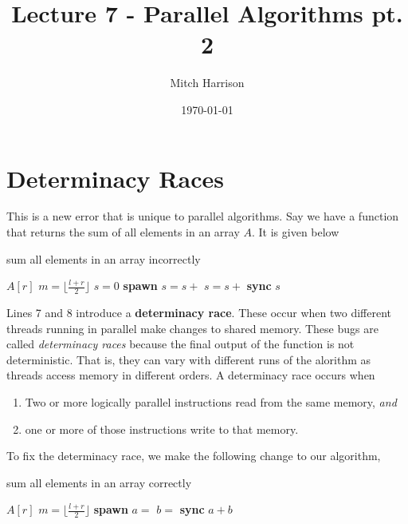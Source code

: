 \documentclass[titlepage, 12pt, leqno]{article}
\title{\Huge{Lecture 7 - Parallel Algorithms pt. 2}}
\author{\large{Mitch Harrison}}
\date{\today}
\begin{document}
\setlength{\parskip}{1\baselineskip}
\setlength{\parindent}{15pt}
\maketitle
\tableofcontents
\newpage


\section{Determinacy Races}

This is a new error that is unique to parallel algorithms. Say we have a
function that returns the sum of all elements in an array $A$. It is given
below

\begin{algorithm}
\caption{sum all elements in an array incorrectly}
\begin{algorithmic}[1]
    \State \Return $A[r]$
    \Else
    \State $m = \lfloor \frac{l+r}{2}\rfloor$
    \State $s=0$
    \State \textbf{spawn} $s = s + $ 
    \State $s = s +$ 
    \State \textbf{sync}
    \State \Return $s$
    \EndIf
\EndProcedure 
\end{algorithmic}
\end{algorithm}

Lines 7 and 8 introduce a \textbf{determinacy race}. These occur when two
different threads running in parallel make changes to shared memory. These bugs
are called \textit{determinacy races} because the final output of the function
is not deterministic. That is, they can vary with different runs of the alorithm
as threads access memory in different orders. A determinacy race occurs when
\begin{enumerate}
    \item Two or more logically parallel instructions read from the same
        memory, \textit{and}
    \item one or more of those instructions write to that memory.
\end{enumerate}

To fix the determinacy race, we make the following change to our algorithm,

\begin{algorithm}
\caption{sum all elements in an array correctly}
\begin{algorithmic}[1]
    \State \Return $A[r]$
    \Else
    \State $m = \lfloor \frac{l+r}{2}\rfloor$
    \State \textbf{spawn} $a = $ 
    \State $b =$ 
    \State \textbf{sync}
    \State \Return $a + b$
    \EndIf
\EndProcedure 
\end{algorithmic}
\end{algorithm}
\end{document}
